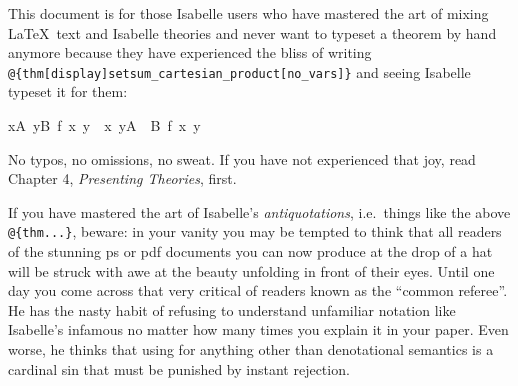 %
\begin{isabellebody}%
\def\isabellecontext{Sugar}%
%
\isadelimtheory
%
\endisadelimtheory
%
\isatagtheory
%
\endisatagtheory
{\isafoldtheory}%
%
\isadelimtheory
%
\endisadelimtheory
%
\isamarkuptrue%
%
\begin{isamarkuptext}%
This document is for those Isabelle users who have mastered
the art of mixing \LaTeX\ text and Isabelle theories and never want to
typeset a theorem by hand anymore because they have experienced the
bliss of writing \verb!@!\verb!{thm[display]setsum_cartesian_product[no_vars]}!
and seeing Isabelle typeset it for them:
\begin{isabelle}%
{}{}x{}A{}\ {}y{}B{}\ f\ x\ y{}\ {}\ {}{}{}x{}\ y{}{}A\ {}\ B{}\ f\ x\ y{}%
\end{isabelle}
No typos, no omissions, no sweat.
If you have not experienced that joy, read Chapter 4, \emph{Presenting
Theories}, \cite{LNCS2283} first.

If you have mastered the art of Isabelle's \emph{antiquotations},
i.e.\ things like the above \verb!@!\verb!{thm...}!, beware: in your vanity
you may be tempted to think that all readers of the stunning ps or pdf
documents you can now produce at the drop of a hat will be struck with
awe at the beauty unfolding in front of their eyes. Until one day you
come across that very critical of readers known as the ``common referee''.
He has the nasty habit of refusing to understand unfamiliar notation
like Isabelle's infamous  no matter how many times you
explain it in your paper. Even worse, he thinks that using  for anything other than denotational semantics is a cardinal sin
that must be punished by instant rejection.



\end{isamarkuptext}
\end{isabellebody}
